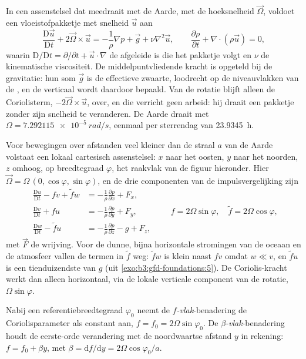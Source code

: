 In een assenstelsel dat meedraait met de Aarde, met de hoeksnelheid
$\vec\Omega$, voldoet een vloeistofpakketje met snelheid $\vec u$ aan
\[
\frac{\mathrm D\vec u}{\mathrm Dt} + 2\vec\Omega\times\vec u =
-\frac{1}{\rho}\nabla p + \vec g + \nu\nabla^2\vec u ,
\qquad
\frac{\partial\rho}{\partial t} + \nabla\cdot(\rho\vec u) = 0 ,
\]
waarin $\mathrm D/\mathrm Dt = \partial/\partial t + \vec u\cdot\nabla$ de afgeleide
is die het pakketje volgt en $\nu$ de kinematische viscositeit. De
middelpuntvliedende kracht is opgeteld bij de gravitatie: hun som $\vec g$ is de
effectieve zwaarte, loodrecht op de niveauvlakken van de , en
de verticaal wordt daardoor bepaald. Van de rotatie blijft alleen de Coriolisterm, $-2\vec\Omega\times
\vec u$, over, en die verricht geen arbeid: hij draait een pakketje
zonder zijn snelheid te veranderen. De Aarde draait met $\Omega =
\qty{7.292115e-5}{rad/s}$, eenmaal per sterrendag van \qty{23.9345}{h}.

Voor bewegingen over afstanden veel kleiner dan de straal $a$ van de Aarde
volstaat een lokaal cartesisch assenstelsel: $x$ naar het oosten, $y$ naar het noorden, $z$ omhoog,
op breedtegraad $\varphi$, het raakvlak van de figuur hieronder. Hier
$\vec\Omega = \Omega\,(0, \cos\varphi, \sin\varphi)$, en de drie
componenten van de impulsvergelijking zijn
\[
\begin{aligned}
\frac{\mathrm Du}{\mathrm Dt} - f v + \tilde f w &= -\frac{1}{\rho}\frac{\partial p}{\partial x} + F_x ,\\
\frac{\mathrm Dv}{\mathrm Dt} + f u &= -\frac{1}{\rho}\frac{\partial p}{\partial y} + F_y ,\\
\frac{\mathrm Dw}{\mathrm Dt} - \tilde f u &= -\frac{1}{\rho}\frac{\partial p}{\partial z} - g + F_z ,
\end{aligned}
\qquad f = 2\Omega\sin\varphi,\quad \tilde f = 2\Omega\cos\varphi ,
\]
met $\vec F$ de wrijving. Voor de dunne, bijna horizontale stromingen van de
oceaan en de atmosfeer vallen de termen in $\tilde f$ weg: $\tilde f w$
is klein naast $fv$ omdat $w \ll v$, en $\tilde f u$ is een tienduizendste
van $g$ (uit \cref{exo:b3:gfd-foundations:5}). De Coriolis-kracht werkt dan alleen
horizontaal, via de lokale verticale component van de rotatie,
$\Omega\sin\varphi$.

\begin{definition}\label{def:b3:gfd-foundations:planes}
Nabij een referentiebreedtegraad $\varphi_0$ neemt de \emph{$f$-vlak}-benadering
de Coriolisparameter als constant aan, $f = f_0 =
2\Omega\sin\varphi_0$. De \emph{$\beta$-vlak}-benadering
houdt de eerste-orde verandering met de noordwaartse afstand $y$ in rekening:
$f = f_0 + \beta y$, met $\beta = \mathrm df/\mathrm dy = 2\Omega
\cos\varphi_0/a$.
\end{definition}

